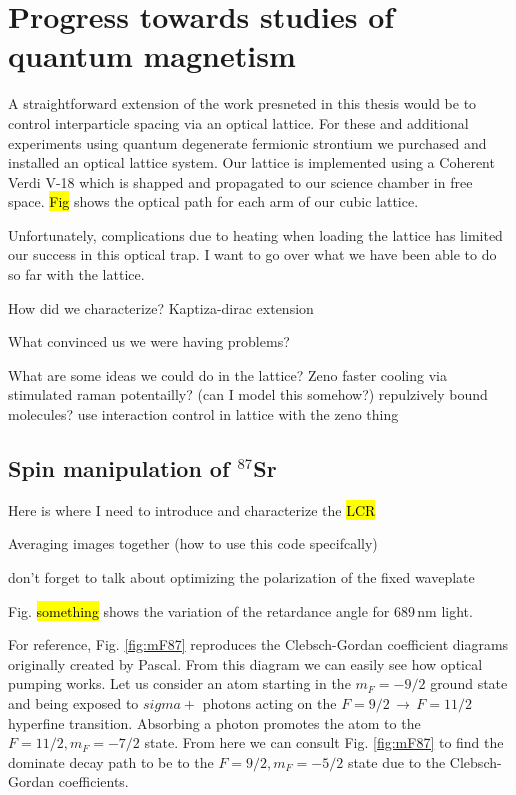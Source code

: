 \chapter{Progress towards studies of quantum magnetism}
\label{ch:chap6}

A straightforward extension of the work presneted in this thesis would be to control interparticle spacing via an optical lattice. For these and additional experiments using quantum degenerate fermionic strontium we purchased and installed an optical lattice system. Our lattice is implemented using a Coherent Verdi V-18 which is shapped and propagated to our science chamber in free space. \hl{Fig} shows the optical path for each arm of our cubic lattice. 

Unfortunately, complications due to heating when loading the lattice has limited our success in this optical trap. I want to go over what we have been able to do so far with the lattice.

How did we characterize?
	Kaptiza-dirac extension
	
What convinced us we were having problems?

What are some ideas we could do in the lattice?
	Zeno
	faster cooling via stimulated raman potentailly? (can I model this somehow?)
	repulzively bound molecules?
	use interaction control in lattice with the zeno thing
	

\section{Spin manipulation of $^{87}$Sr}
\label{sec:spin_pol}

Here is where I need to introduce and characterize the \hl{LCR}

Averaging images together (how to use this code specifcally)

don't forget to talk about optimizing the polarization of the fixed waveplate

Fig. \hl{something} shows the variation of the retardance angle for 689\,nm light.

For reference, Fig. \ref{fig:mF87} reproduces the Clebsch-Gordan coefficient diagrams originally created by Pascal.
From this diagram we can easily see how optical pumping works.
Let us consider an atom starting in the $m_F=-9/2$ ground state and being exposed to $sigma+$ photons acting on the $F=9/2\,\rightarrow\,F=11/2$ hyperfine transition.
Absorbing a photon promotes the atom to the $F=11/2, m_F=-7/2$ state.
From here we can consult Fig. \ref{fig:mF87} to find the dominate decay path to be to the $F=9/2, m_F=-5/2$ state due to the Clebsch-Gordan coefficients.

